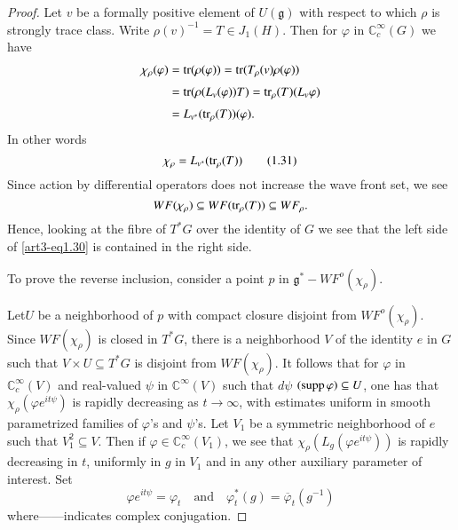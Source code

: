 \begin{proof}
Let $v$ be a formally positive element of $U(\mathfrak{g})$ with respect to which $\rho$ is strongly trace class. Write $\rho(v)^{-1}=T\in J_{1}(H)$. Then for $\varphi$ in $\mathbb{C}^{\infty}_{c}(G)$ we have
\begin{align*}
\chi_{\rho}(\varphi) &= \operatorname{tr}(\rho(\varphi))=\operatorname{tr}(T_{\rho}(v)\rho(\varphi))\\[3pt]
&= \operatorname{tr}(\rho(L_{v}(\varphi))T)=\operatorname{tr}_{\rho}(T)(L_{v}\varphi)\\[3pt]
&= L_{v^{*}}(\operatorname{tr}_{\rho}(T))(\varphi).
\end{align*}
In other words
\begin{equation*}
\chi_{\rho}=L_{v^{*}}(\operatorname{tr}_{\rho}(T))\tag{1.31}\label{art3-eq1.31}
\end{equation*}
Since action by differential operators does not increase the wave front set, we see
$$
WF(\chi_{\rho})\subseteq WF(\operatorname{tr}_{\rho}(T))\subseteq WF_{\rho}.
$$
Hence, looking at the fibre of $T^{*}G$ over the identity of $G$ we see that the left side of \eqref{art3-eq1.30} is contained in the right side.

To prove the reverse inclusion, consider a point $p$ in $\mathfrak{g}^{*}-WF^{o}(\chi_{\rho})$. 

Let\pageoriginale $U$ be a neighborhood of $p$ with compact closure disjoint from $WF^{o}(\chi_{\rho})$. Since $WF(\chi_{\rho})$ is closed in $T^{*}G$, there is a neighborhood $V$ of the identity $e$ in $G$ such that $V\times U\subseteq T^{*}G$ is disjoint from $WF(\chi_{\rho})$. It follows that for $\varphi$ in $\mathbb{C}^{\infty}_{c}(V)$ and real-valued $\psi$ in $\mathbb{C}^{\infty}(V)$ such that $d\psi$ $(\operatorname{supp} \varphi)\subseteq U$, one has that $\chi_{\rho}(\varphi e^{it\psi})$ is rapidly decreasing as $t\to \infty$, with estimates uniform in smooth parametrized families of $\varphi$'s and $\psi$'s. Let $V_{1}$ be a symmetric neighborhood of $e$ such that $V^{2}_{1}\subseteq V$. Then if $\varphi\in \mathbb{C}^{\infty}_{c}(V_{1})$, we see that $\chi_{\rho}(L_{g}(\varphi e^{it\psi}))$ is rapidly decreasing in $t$, uniformly in $g$ in $V_{1}$ and in any other auxiliary parameter of interest. Set
$$
\varphi e^{it\psi}=\varphi_{t}\quad\text{and}\quad \varphi^{*}_{t}(g)=\overline{\varphi}_{t}(g^{-1})
$$
where------indicates complex conjugation.


\end{proof}
